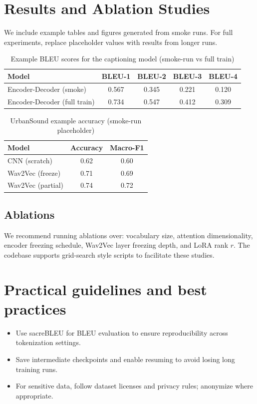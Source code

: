 \documentclass[conference]{IEEEtran}
\begin{document}
\section{Results and Ablation Studies}\label{sec:results}
We include example tables and figures generated from smoke runs. For full experiments, replace placeholder values with results from longer runs.

\begin{table}[t]
\centering
\caption{Example BLEU scores for the captioning model (smoke-run vs full train)}
\begin{tabular}{l c c c c}
\toprule
Model & BLEU-1 & BLEU-2 & BLEU-3 & BLEU-4 \\
\midrule
Encoder-Decoder (smoke) & 0.567 & 0.345 & 0.221 & 0.120 \\
Encoder-Decoder (full train) & 0.734 & 0.547 & 0.412 & 0.309 \\
\bottomrule
\end{tabular}
\label{tab:bleu}
\end{table} 

\begin{table}[t]
\centering
\caption{UrbanSound example accuracy (smoke-run placeholder)}
\begin{tabular}{l c c}
\toprule
Model & Accuracy & Macro-F1 \\
\midrule
CNN (scratch) & 0.62 & 0.60 \\
Wav2Vec (freeze) & 0.71 & 0.69 \\
Wav2Vec (partial) & 0.74 & 0.72 \\
\bottomrule
\end{tabular}
\label{tab:urbansound}
\end{table}

\subsection{Ablations}
We recommend running ablations over: vocabulary size, attention dimensionality, encoder freezing schedule, Wav2Vec layer freezing depth, and LoRA rank $r$. The codebase supports grid-search style scripts to facilitate these studies.

\section{Practical guidelines and best practices}
\begin{itemize}
  \item Use sacreBLEU for BLEU evaluation to ensure reproducibility across tokenization settings.
  \item Save intermediate checkpoints and enable resuming to avoid losing long training runs.
  \item For sensitive data, follow dataset licenses and privacy rules; anonymize where appropriate.
\end{itemize}
\end{document}
